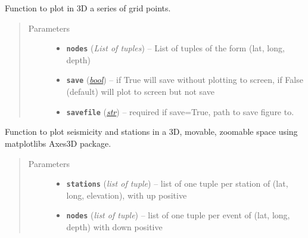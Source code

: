 \documentclass[a4paper,10pt,english]{sphinxmanual}
\begin{document}
\begin{fulllineitems}
\label{submodules/utils.EQcorrscan_plotting:EQcorrscan_plotting.threeD_gridplot}
Function to plot in 3D a series of grid points.
\begin{quote}\begin{description}
\item[{Parameters}] \leavevmode\begin{itemize}
\item {} 
\textbf{\texttt{nodes}} (\emph{List of tuples}) -- List of tuples of the form (lat, long, depth)

\item {} 
\textbf{\texttt{save}} (\href{https://docs.python.org/library/functions.html\#bool}{\emph{bool}}) -- if True will save without plotting to screen, if False        (default) will plot to screen but not save

\item {} 
\textbf{\texttt{savefile}} (\href{https://docs.python.org/library/functions.html\#str}{\emph{str}}) -- required if save=True, path to save figure to.

\end{itemize}

\end{description}\end{quote}

\end{fulllineitems}


\begin{fulllineitems}
\label{submodules/utils.EQcorrscan_plotting:EQcorrscan_plotting.threeD_seismplot}
Function to plot seismicity and stations in a 3D, movable, zoomable space
using matplotlibs Axes3D package.
\begin{quote}\begin{description}
\item[{Parameters}] \leavevmode\begin{itemize}
\item {} 
\textbf{\texttt{stations}} (\emph{list of tuple}) -- list of one tuple per station of (lat, long, elevation),
with up positive

\item {} 
\textbf{\texttt{nodes}} (\emph{list of tuple}) -- list of one tuple per event of (lat, long, depth) with down
positive

\end{itemize}

\end{description}\end{quote}

\end{fulllineitems}
\end{document}
